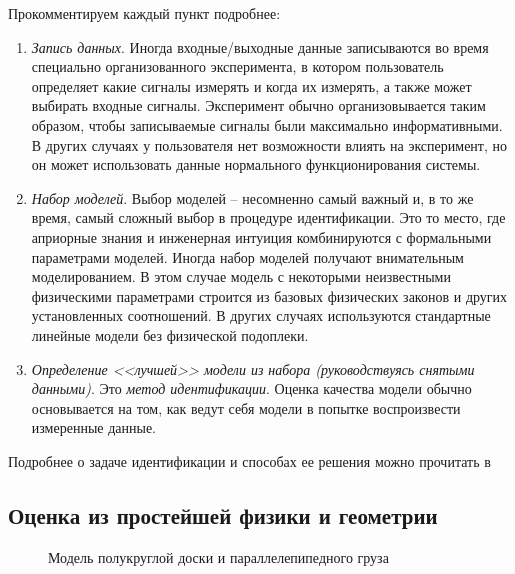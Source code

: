 \documentclass[12pt,a4paper]{article}
\begin{document}
Прокомментируем каждый пункт подробнее:

\begin{enumerate}
	\item \textit{Запись данных}. Иногда входные/выходные данные записываются во время специально организованного эксперимента, в котором пользователь определяет какие сигналы измерять и когда их измерять, а также может выбирать входные сигналы. Эксперимент обычно организовывается таким образом, чтобы записываемые сигналы были максимально информативными. В других случаях у пользователя нет возможности влиять на эксперимент, но он может использовать данные нормального функционирования системы.

	\item \textit{Набор моделей}. Выбор моделей -- несомненно самый важный и, в то же время, самый сложный выбор в процедуре идентификации. Это то место, где априорные знания и инженерная интуиция комбинируются с формальными параметрами моделей. Иногда набор моделей получают внимательным моделированием. В этом случае модель с некоторыми неизвестными физическими параметрами строится из базовых физических законов и других установленных соотношений. В других случаях используются стандартные линейные модели без физической подоплеки.

	\item \textit{Определение <<лучшей>> модели из набора (руководствуясь снятыми данными)}. Это \textit{метод идентификации}. Оценка качества модели обычно основывается на том, как ведут себя модели в попытке воспроизвести измеренные данные.
\end{enumerate}

Подробнее о задаче идентификации и способах ее решения можно прочитать в \cite{ljung_identification}

\subsection{Оценка из простейшей физики и геометрии}

\begin{figure}
	\def\R{2.5}
	\def\w{2}
	\def\h{4}
	\def\d{1}

	\centering
	\caption{Модель полукруглой доски и параллелепипедного груза}	
	\label{fig:simple_model}
\end{figure}
\end{document}
